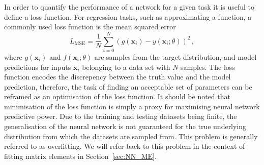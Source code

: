 \documentclass[main.tex]{subfiles}
\begin{document}
    In order to quantify the performance of a network for
    a given task it is useful to define a loss function.
    For regression tasks, such as approximating a function,
    a commonly used loss function is the mean squared error
    \begin{equation}\label{eqn:MSE}
        L_{\mathrm{MSE}} = \dfrac{1}{N} \sum_{i=0}^{N} (g(\mathbf{x}_{i}) - y(\mathbf{x}_{i}; \theta))^{2} \, ,
    \end{equation}
    where $g(\mathbf{x}_{i})$ and $f(\mathbf{x}_{i}; \theta)$
    are samples from the target distribution, and model predictions
    for inputs $\mathbf{x}_{i}$ belonging to a data set with $N$
    samples. The loss function
    encodes the discrepency between the truth value
    and the model prediction, therefore, the task of finding
    an acceptable set of parameters can be reframed as an optimisation
    of the loss function. It should be noted that minimisation of
    the loss function is simply a proxy for maximising neural network
    predictive power. Due to the training and testing datasets being finite,
    the generalisation of the neural network is not guaranteed for the
    true underlying distribution from which the datasets are sampled
    from. This problem is generally referred to as overfitting.
    We will refer back to this problem in the context of
    fitting matrix elements in Section~\ref{sec:NN_ME}.
\end{document}
